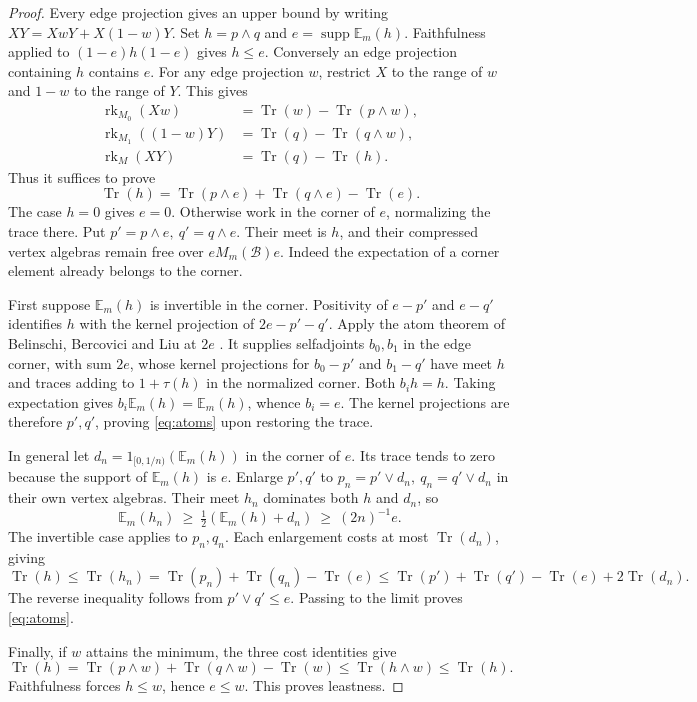 \documentclass[11pt,a4paper,reqno]{amsart}
\numberwithin{equation}{section}
\theoremstyle{remark}
\newcommand{\Tr}{\operatorname{Tr}}
\newcommand{\rk}{\operatorname{rk}}
\DeclareMathOperator{\supp}{supp}
\begin{document}
\begin{proof}
Every edge projection gives an upper bound by writing \(XY=XwY+X(1-w)Y\). Set \(h=p\wedge q\) and \(e=\supp\mathbb E_m(h)\). Faithfulness applied to \((1-e)h(1-e)\) gives \(h\le e\). Conversely an edge projection containing \(h\) contains \(e\). For any edge projection \(w\), restrict \(X\) to the range of \(w\) and \(1-w\) to the range of \(Y\). This gives
\[
 \begin{split}
 \rk_{M_0}(Xw)&=\Tr(w)-\Tr(p\wedge w),\\
 \rk_{M_1}((1-w)Y)&=\Tr(q)-\Tr(q\wedge w),\\
 \rk_M(XY)&=\Tr(q)-\Tr(h).
 \end{split}
\]
Thus it suffices to prove
\begin{equation}\label{eq:atoms}
          \Tr(h)=\Tr(p\wedge e)+\Tr(q\wedge e)-\Tr(e).
\end{equation}
The case \(h=0\) gives \(e=0\). Otherwise work in the corner of \(e\), normalizing the trace there. Put \(p'=p\wedge e,\ q'=q\wedge e\). Their meet is \(h\), and their compressed vertex algebras remain free over \(eM_m(\mathcal B)e\). Indeed the expectation of a corner element already belongs to the corner.

First suppose \(\mathbb E_m(h)\) is invertible in the corner. Positivity of \(e-p'\) and \(e-q'\) identifies \(h\) with the kernel projection of \(2e-p'-q'\). Apply the atom theorem of Belinschi, Bercovici and Liu at \(2e\) \cite[Theorem~3.5(vii), arXiv v2]{BBL}. It supplies selfadjoints \(b_0,b_1\) in the edge corner, with sum \(2e\), whose kernel projections for \(b_0-p'\) and \(b_1-q'\) have meet \(h\) and traces adding to \(1+\tau(h)\) in the normalized corner. Both \(b_i h=h\). Taking expectation gives \(b_i\mathbb E_m(h)=\mathbb E_m(h)\), whence \(b_i=e\). The kernel projections are therefore \(p',q'\), proving \eqref{eq:atoms} upon restoring the trace.

In general let \(d_n=1_{[0,1/n)}(\mathbb E_m(h))\) in the corner of \(e\). Its trace tends to zero because the support of \(\mathbb E_m(h)\) is \(e\). Enlarge \(p',q'\) to \(p_n=p'\vee d_n,\ q_n=q'\vee d_n\) in their own vertex algebras. Their meet \(h_n\) dominates both \(h\) and \(d_n\), so
\[
 \mathbb E_m(h_n)\ \ge\ \tfrac12(\mathbb E_m(h)+d_n)\ \ge\ (2n)^{-1}e .
\]
The invertible case applies to \(p_n,q_n\). Each enlargement costs at most \(\Tr(d_n)\), giving
\[
 \Tr(h)\le\Tr(h_n)=\Tr(p_n)+\Tr(q_n)-\Tr(e)
          \le\Tr(p')+\Tr(q')-\Tr(e)+2\Tr(d_n).
\]
The reverse inequality follows from \(p'\vee q'\le e\). Passing to the limit proves \eqref{eq:atoms}.

Finally, if \(w\) attains the minimum, the three cost identities give
\[
 \Tr(h)=\Tr(p\wedge w)+\Tr(q\wedge w)-\Tr(w)
       \le \Tr(h\wedge w)\le\Tr(h).
\]
Faithfulness forces \(h\le w\), hence \(e\le w\). This proves leastness.
\end{proof}
\end{document}

